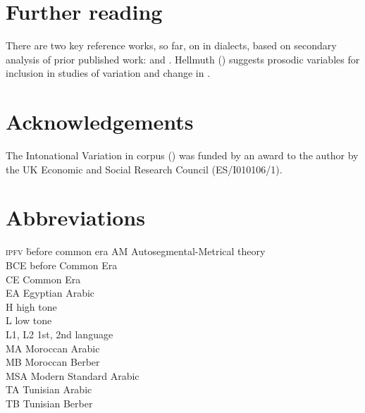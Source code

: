 \documentclass[output=paper]{langsci/langscibook}
\begin{document}
\section*{Further reading}

There are two key reference works, so far, on  in  dialects, based on secondary analysis of prior published work: \citet{Chahal2011} and \citet{ElZarka2017}. Hellmuth (\citeyear{Hellmuth2019}) suggests prosodic variables for inclusion in studies of variation and change in . 

\section*{Acknowledgements}

The Intonational Variation in  corpus (\citealt{HellmuthAlmbark2017}) was funded by an award to the author by the UK Economic and Social Research Council (ES/I010106/1).

\section*{Abbreviations}
\setlength{\columnsep}{30pt}
\begin{multicols}{2}
\begin{tabbing}
\textsc{ipfv} \hspace{1em} \= before common era\kill
AM \> Autosegmental-Metrical theory \hspace{10mm} \\
BCE \> before Common Era \\
CE \> Common Era \\
EA \> Egyptian Arabic \\
H \> high {tone} \\
L \> low {tone} \\
L1, L2 \> 1st, 2nd language \\
MA \> Moroccan Arabic \\
MB \> {Moroccan Berber} \\
MSA \> Modern Standard {Arabic} \\
{TA} \> {Tunisian Arabic} \\
{TB} \> {Tunisian Berber} 
\end{tabbing}
\end{multicols}

\sloppy
\printbibliography[heading=subbibliography,notkeyword=this]
\end{document}
